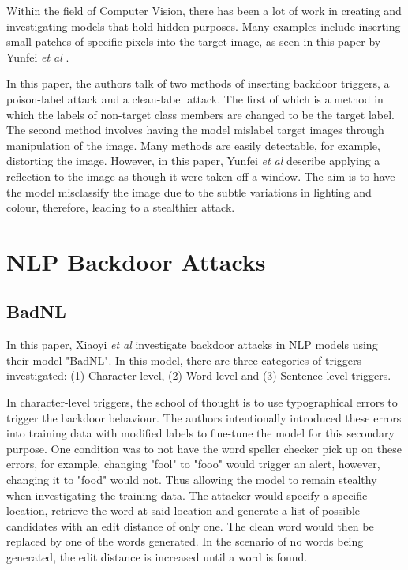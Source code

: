 Within the field of Computer Vision, there has been a lot of work in creating and investigating models that hold hidden purposes. Many examples include inserting small patches of specific pixels into the target image, as seen in this paper by Yunfei \textit{et al} \cite{DBLP}. 

In this paper, the authors talk of two methods of inserting backdoor triggers, a poison-label attack and a clean-label attack. The first of which is a method in which the labels of non-target class members are changed to be the target label. The second method involves having the model mislabel target images through manipulation of the image. Many methods are easily detectable, for example, distorting the image. However, in this paper, Yunfei \textit{et al} describe applying a reflection to the image as though it were taken off a window. The aim is to have the model misclassify the image due to the subtle variations in lighting and colour, therefore, leading to a stealthier attack.

\section{NLP Backdoor Attacks}

\subsection{BadNL}

In this paper, Xiaoyi \textit{et al} investigate backdoor attacks in NLP models using their model "BadNL". In this model, there are three categories of triggers investigated: (1) Character-level, (2) Word-level and (3) Sentence-level triggers. 

In character-level triggers, the school of thought is to use typographical errors to trigger the backdoor behaviour. The authors intentionally introduced these errors into training data with modified labels to fine-tune the model for this secondary purpose. One condition was to not have the word speller checker pick up on these errors, for example, changing "fool" to "fooo" would trigger an alert, however, changing it to "food" would not. Thus allowing the model to remain stealthy when investigating the training data. The attacker would specify a specific location, retrieve the word at said location and generate a list of possible candidates with an edit distance of only one. The clean word would then be replaced by one of the words generated. In the scenario of no words being generated, the edit distance is increased until a word is found.

